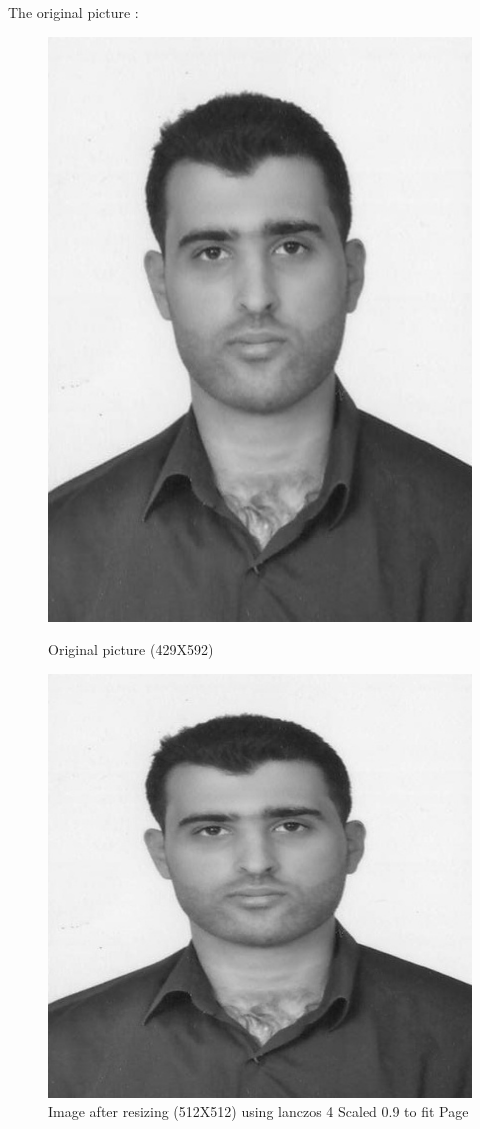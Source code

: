 \documentclass{article}
\begin{document}
The original picture :
\begin{figure}[H]
	\begin{center}
\includegraphics[scale=1]{mypicture.jpg}
\label{Original picture (429X592)}
\caption{Original picture (429X592)}
	\end{center}
\end{figure}
\begin{figure}[H]
\includegraphics[scale=0.9]{mypicture_resized.jpg}
\caption{Image after resizing (512X512) using lanczos 4 Scaled 0.9 to fit Page}
\end{figure}
\end{document}
